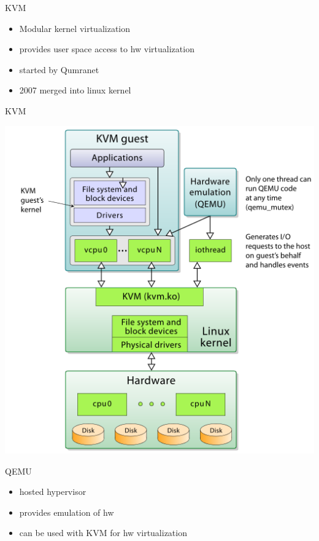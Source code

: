 \documentclass[presentation]{beamer}
\begin{document}
\begin{frame}[label={sec:orge81c349}]{KVM}
\begin{itemize}
\item Modular kernel virtualization
\item provides user space access to hw virtualization
\item started by Qumranet
\item 2007 merged into linux kernel
\end{itemize}
\end{frame}
\begin{frame}[label={sec:orge074f98}]{KVM}
\begin{center}
\includegraphics[width=.9\linewidth]{./kvm.png}
\end{center}
\end{frame}

\begin{frame}[label={sec:orgbcadd30}]{QEMU}
\begin{itemize}
\item hosted hypervisor
\item provides emulation of hw
\item can be used with KVM for hw virtualization
\end{itemize}
\end{frame}
\end{document}
